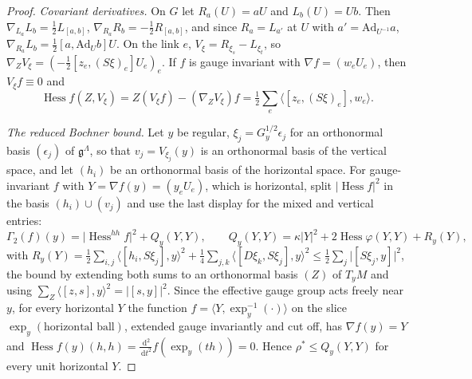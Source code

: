 \documentclass[11pt,a4paper]{amsart}
\theoremstyle{definition}
\theoremstyle{remark}
\numberwithin{equation}{section}
\DeclareMathOperator{\Hess}{Hess}    %
\newcommand{\ip}[2]{\langle #1,#2\rangle}  %
\newcommand{\abs}[1]{\lvert #1\rvert}      %
\newcommand{\dd}{\,\mathrm{d}}             %
\begin{document}
\begin{proof}
\emph{Covariant derivatives.} On $G$ let $R_a(U)=aU$ and $L_b(U)=Ub$. Then $\nabla_{L_a}L_b=\frac12L_{[a,b]}$, $\nabla_{R_a}R_b=-\frac12R_{[a,b]}$, and since $R_a=L_{a'}$ at $U$ with $a'=\mathrm{Ad}_{U^{-1}}a$, $\nabla_{R_a}L_b=\frac12[a,\mathrm{Ad}_Ub]U$. On the link $e$, $V_\xi=R_{\xi_s}-L_{\xi_t}$, so $\nabla_ZV_\xi=(-\frac12[z_e,(S\xi)_e]U_e)_e$. If $f$ is gauge invariant with $\nabla f=(w_eU_e)$, then $V_\xi f\equiv0$ and
\[
\Hess f(Z,V_\xi)=Z(V_\xi f)-(\nabla_ZV_\xi)f=\tfrac12\sum_e\ip{[z_e,(S\xi)_e]}{w_e}.
\]

\emph{The reduced Bochner bound.} Let $y$ be regular, $\xi_j=G_y^{1/2}\epsilon_j$ for an orthonormal basis $(\epsilon_j)$ of $\mathfrak g^\Lambda$, so that $v_j=V_{\xi_j}(y)$ is an orthonormal basis of the vertical space, and let $(h_i)$ be an orthonormal basis of the horizontal space. For gauge-invariant $f$ with $Y=\nabla f(y)=(y_eU_e)$, which is horizontal, split $\abs{\Hess f}^2$ in the basis $(h_i)\cup(v_j)$ and use the last display for the mixed and vertical entries:
\[
\Gamma_2(f)(y)=\abs{\Hess^{hh}f}^2+Q_y(Y,Y),\qquad Q_y(Y,Y)=\kappa\abs Y^2+2\Hess\varphi(Y,Y)+R_y(Y),
\]
with $R_y(Y)=\frac12\sum_{i,j}\ip{[h_i,S\xi_j]}y^2+\frac14\sum_{j,k}\ip{[D\xi_k,S\xi_j]}y^2\le\frac12\sum_j\abs{[S\xi_j,y]}^2$, the bound by extending both sums to an orthonormal basis $(Z)$ of $T_yM$ and using $\sum_Z\ip{[z,s]}y^2=\abs{[s,y]}^2$. Since the effective gauge group acts freely near $y$, for every horizontal $Y$ the function $f=\ip Y{\exp_y^{-1}(\cdot)}$ on the slice $\exp_y(\text{horizontal ball})$, extended gauge invariantly and cut off, has $\nabla f(y)=Y$ and $\Hess f(y)(h,h)=\frac{\dd^2}{\dd t^2}f(\exp_y(th))=0$. Hence $\rho^*\le Q_y(Y,Y)$ for every unit horizontal $Y$.


\end{proof}
\end{document}
